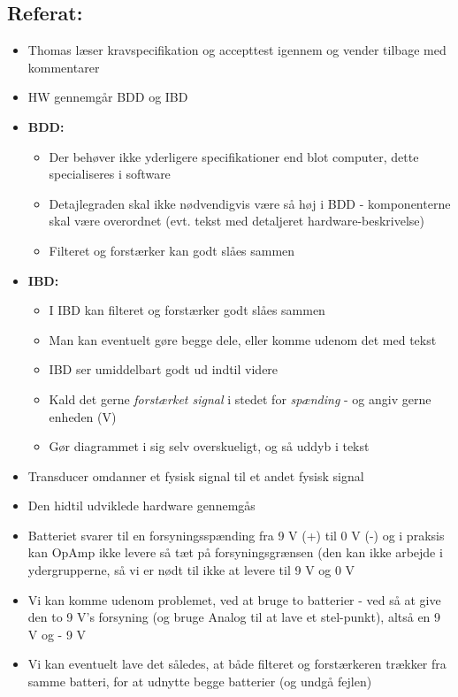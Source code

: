 \documentclass[a4paper,11pt,oneside]{memoir}
\begin{document}
\subsection{Referat:}
\begin{itemize}
\item Thomas læser kravspecifikation og accepttest igennem og vender tilbage med kommentarer 
\item HW gennemgår BDD og IBD
\item \textbf{BDD:}
\begin{itemize}
\item Der behøver ikke yderligere specifikationer end blot computer, dette specialiseres i software
\item Detajlegraden skal ikke nødvendigvis være så høj i BDD - komponenterne skal være overordnet (evt. tekst med detaljeret hardware-beskrivelse)
\item Filteret og forstærker kan godt slåes sammen
\end{itemize}
\item \textbf{IBD:}
\begin{itemize}
\item I IBD kan filteret og forstærker godt slåes sammen
\item Man kan eventuelt gøre begge dele, eller komme udenom det med tekst
\item IBD ser umiddelbart godt ud indtil videre 
\item Kald det gerne \textit{forstærket signal} i stedet for \textit{spænding} - og angiv gerne enheden (V)
\item Gør diagrammet i sig selv overskueligt, og så uddyb i tekst
\end{itemize}
\item Transducer omdanner et fysisk signal til et andet fysisk signal
\item Den hidtil udviklede hardware gennemgås 
\item Batteriet svarer til en forsyningsspænding fra 9 V (+) til 0 V (-) og i praksis kan OpAmp ikke levere så tæt på forsyningsgrænsen (den kan ikke arbejde i ydergrupperne, så vi er nødt til ikke at levere til 9 V og 0 V
\item Vi kan komme udenom problemet, ved at bruge to batterier - ved så at give den to 9 V's forsyning (og bruge Analog til at lave et stel-punkt), altså en 9 V og - 9 V
\item Vi kan eventuelt lave det således, at både filteret og forstærkeren trækker fra samme batteri, for at udnytte begge batterier (og undgå fejlen)

\end{itemize}
\end{document}
